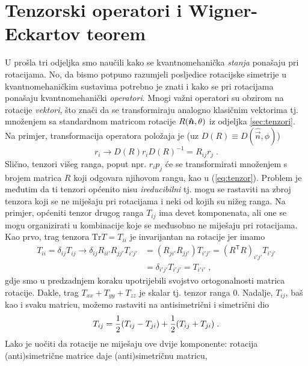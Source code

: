 \section{Tenzorski operatori i Wigner-Eckartov teorem}
\label{sec:tenzorskioperatori}

U prošla tri odjeljka smo naučili kako se kvantnomehanička \emph{stanja}
ponašaju pri rotacijama.
No, da bismo potpuno razumjeli posljedice rotacijske simetrije u
kvantnomehaničkim sustavima
potrebno je znati i kako se pri rotacijama ponašaju kvantnomehanički
\emph{operatori}. Mnogi važni operatori su obzirom na rotacije \emph{vektori},
što znači da se transformiraju analogno klasičnim vektorima tj. množenjem
sa standardnom matricom rotacije $R(\unitn, \theta)$ iz odjeljka
\ref{sec:tenzori}. Na primjer, transformacija operatora položaja je
(uz $D(R) \equiv D(\hat{\vec{n}},\phi)$)
\begin{equation}
    r_i \longrightarrow D(R) r_i D(R)^{-1} = R_{ij} r_j \;.
\end{equation}
 
Slično, tenzori višeg ranga, poput npr. $r_i p_j$ će se transformirati
množenjem s brojem matrica $R$ koji odgovara njihovom rangu, kao
u (\ref{eq:tenzor}). Problem je međutim da ti tenzori općenito nisu
\emph{ireducibilni} tj. mogu se rastaviti na zbroj tenzora
koji se ne miješaju pri rotacijama i neki od kojih su
nižeg ranga. Na primjer, općeniti tenzor drugog ranga $T_{ij}$ ima
devet komponenata, ali one se mogu organizirati u kombinacije
koje se međusobno ne miješaju pri rotacijama. 
Kao prvo, trag tenzora $\mathrm{Tr} T = T_{ii}$ je invarijantan
na rotacije jer imamo
\begin{align*}
 T_{ii} = \delta_{ij} T_{ij} \longrightarrow
\delta_{ij} R_{i i'} R_{j j'} T_{i' j'}& = (R_{j i'} R_{j j'}) T_{i' j'}
= (R^{\mathsf{T}} R)_{i' j'} T_{i' j'} \\
& = \delta_{i' j'} T_{i' j'} = T_{i' i'} \;,
\end{align*}
gdje smo u predzadnjem koraku upotrijebili svojstvo ortogonalnosti
matrica rotacije. Dakle, trag 
 $T_{xx} + T_{yy} + T_{zz}$ je skalar tj. tenzor ranga 0.
Nadalje, $T_{ij}$, baš kao i svaku matricu, možemo
rastaviti na antisimetrični i simetrični dio
\begin{equation}
  T_{ij} = \frac{1}{2} (T_{ij} - T_{ji}) + \frac{1}{2} (T_{ij} + T_{ji}) \;.
\label{eq:SplA}
\end{equation}
Lako je uočiti da rotacije ne miješaju ove dvije komponente:
rotacija (anti)si\-met\-ri\-čne matrice daje (anti)simetričnu matricu,
